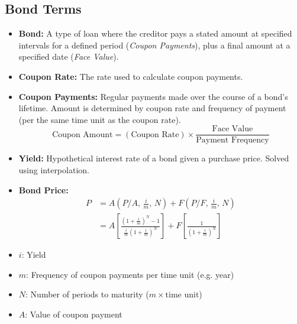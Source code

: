 \subsection{Bond Terms}
\begin{terminology}
    \begin{itemize}
        \item \textbf{Bond:} A type of loan where the creditor pays a stated amount at specified intervals for a defined period (\textit{Coupon Payments}), plus a final amount at a specified date (\textit{Face Value}).
        \item \textbf{Coupon Rate:} The rate used to calculate coupon payments.
        \item \textbf{Coupon Payments:} Regular payments made over the course of a bond’s lifetime. Amount is determined by coupon rate and frequency of payment (per the same time unit as the coupon rate).
        \begin{equation}
            \text{Coupon Amount} = (\text{Coupon Rate}) \times \frac{\text{Face Value}}{\text{Payment Frequency}}
        \end{equation}
        
        \item \textbf{Yield:} Hypothetical interest rate of a bond given a purchase price. Solved using interpolation.
        
        \item \textbf{Bond Price:}
        \begin{equation}
            \begin{aligned}
                P &= A \left(P/A, \, \frac{i}{m}, \, N\right) + F \left(P/F, \, \frac{i}{m}, \, N\right) \\
                &= A \left[\frac{(1 + \frac{i}{m})^{N} - 1}{\frac{i}{m} (1 + \frac{i}{m})^{N}}\right] + F \left[\frac{1}{(1 + \frac{i}{m})^{N}}\right]
            \end{aligned}
        \end{equation}
        
    \end{itemize}
    
    
    \begin{itemize}
        \item $i$: Yield
        \item $m$: Frequency of coupon payments per time unit (e.g. year)
        \item $N$: Number of periods to maturity ($m \times \text{time unit}$)
        \item $A$: Value of coupon payment
    \end{itemize}
\end{terminology}